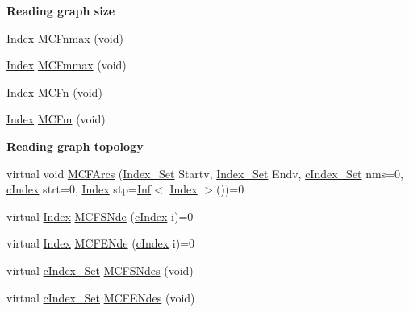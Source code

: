 \begin{Indent}\textbf{ Reading graph size}\par
\begin{DoxyCompactItemize}
\item 
\mbox{\hyperlink{class_m_c_f_class_ad53d6229d7ec28555a9c9c2fd9abf773}{Index}} \mbox{\hyperlink{class_m_c_f_class_acfb1bca6eb363c912c45c587f4bc214b}{M\+C\+Fnmax}} (void)
\item 
\mbox{\hyperlink{class_m_c_f_class_ad53d6229d7ec28555a9c9c2fd9abf773}{Index}} \mbox{\hyperlink{class_m_c_f_class_af63cff04d49de9f84b9ddc8585334690}{M\+C\+Fmmax}} (void)
\item 
\mbox{\hyperlink{class_m_c_f_class_ad53d6229d7ec28555a9c9c2fd9abf773}{Index}} \mbox{\hyperlink{class_m_c_f_class_a6438187f454e795c03a850bfab31be84}{M\+C\+Fn}} (void)
\item 
\mbox{\hyperlink{class_m_c_f_class_ad53d6229d7ec28555a9c9c2fd9abf773}{Index}} \mbox{\hyperlink{class_m_c_f_class_ab4d5a0d0fc49882de0b4eb3146f1b7a6}{M\+C\+Fm}} (void)
\end{DoxyCompactItemize}
\end{Indent}
\begin{Indent}\textbf{ Reading graph topology}\par
\begin{DoxyCompactItemize}
\item 
virtual void \mbox{\hyperlink{class_m_c_f_class_aa2314bf81483649dd1cb9dada0de6832}{M\+C\+F\+Arcs}} (\mbox{\hyperlink{class_m_c_f_class_ace3388eb329ff0551a0b86b6c67e33d8}{Index\+\_\+\+Set}} Startv, \mbox{\hyperlink{class_m_c_f_class_ace3388eb329ff0551a0b86b6c67e33d8}{Index\+\_\+\+Set}} Endv, \mbox{\hyperlink{class_m_c_f_class_a81575b2d4e4d5636b17170432150ae69}{c\+Index\+\_\+\+Set}} nms=0, \mbox{\hyperlink{class_m_c_f_class_a76aaabb20535c51a2752b93f6c38fe54}{c\+Index}} strt=0, \mbox{\hyperlink{class_m_c_f_class_ad53d6229d7ec28555a9c9c2fd9abf773}{Index}} stp=\mbox{\hyperlink{class_o_p_ttypes__di__unipi__it_1_1_inf}{Inf}}$<$ \mbox{\hyperlink{class_m_c_f_class_ad53d6229d7ec28555a9c9c2fd9abf773}{Index}} $>$())=0
\item 
virtual \mbox{\hyperlink{class_m_c_f_class_ad53d6229d7ec28555a9c9c2fd9abf773}{Index}} \mbox{\hyperlink{class_m_c_f_class_ae3f1b21bfe422e2d54de0dc56231599b}{M\+C\+F\+S\+Nde}} (\mbox{\hyperlink{class_m_c_f_class_a76aaabb20535c51a2752b93f6c38fe54}{c\+Index}} i)=0
\item 
virtual \mbox{\hyperlink{class_m_c_f_class_ad53d6229d7ec28555a9c9c2fd9abf773}{Index}} \mbox{\hyperlink{class_m_c_f_class_a1b0d5b8f2dfd729783e7c0fd604dc896}{M\+C\+F\+E\+Nde}} (\mbox{\hyperlink{class_m_c_f_class_a76aaabb20535c51a2752b93f6c38fe54}{c\+Index}} i)=0
\item 
virtual \mbox{\hyperlink{class_m_c_f_class_a81575b2d4e4d5636b17170432150ae69}{c\+Index\+\_\+\+Set}} \mbox{\hyperlink{class_m_c_f_class_a3aeea0e6fd59fc54c2d7a0d21099ea21}{M\+C\+F\+S\+Ndes}} (void)
\item 
virtual \mbox{\hyperlink{class_m_c_f_class_a81575b2d4e4d5636b17170432150ae69}{c\+Index\+\_\+\+Set}} \mbox{\hyperlink{class_m_c_f_class_a5494247213fd86574798bba97a2eb604}{M\+C\+F\+E\+Ndes}} (void)
\end{DoxyCompactItemize}
\end{Indent}
